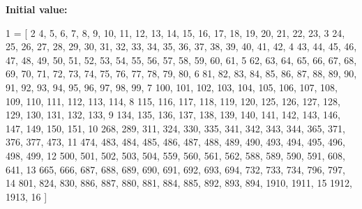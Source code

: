 {\bfseries Initial value\+:}
\begin{DoxyCode}
1 =  [
2     4, 5, 6, 7, 8, 9, 10, 11, 12, 13, 14, 15, 16, 17, 18, 19, 20, 21, 22, 23,
3     24, 25, 26, 27, 28, 29, 30, 31, 32, 33, 34, 35, 36, 37, 38, 39, 40, 41, 42,
4     43, 44, 45, 46, 47, 48, 49, 50, 51, 52, 53, 54, 55, 56, 57, 58, 59, 60, 61,
5     62, 63, 64, 65, 66, 67, 68, 69, 70, 71, 72, 73, 74, 75, 76, 77, 78, 79, 80,
6     81, 82, 83, 84, 85, 86, 87, 88, 89, 90, 91, 92, 93, 94, 95, 96, 97, 98, 99,
7     100, 101, 102, 103, 104, 105, 106, 107, 108, 109, 110, 111, 112, 113, 114,
8     115, 116, 117, 118, 119, 120, 125, 126, 127, 128, 129, 130, 131, 132, 133,
9     134, 135, 136, 137, 138, 139, 140, 141, 142, 143, 146, 147, 149, 150, 151,
10     268, 289, 311, 324, 330, 335, 341, 342, 343, 344, 365, 371, 376, 377, 473,
11     474, 483, 484, 485, 486, 487, 488, 489, 490, 493, 494, 495, 496, 498, 499,
12     500, 501, 502, 503, 504, 559, 560, 561, 562, 588, 589, 590, 591, 608, 641,
13     665, 666, 687, 688, 689, 690, 691, 692, 693, 694, 732, 733, 734, 796, 797,
14     801, 824, 830, 886, 887, 880, 881, 884, 885, 892, 893, 894, 1910, 1911,
15     1912, 1913,
16 ]
\end{DoxyCode}
